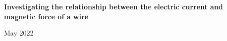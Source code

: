 \documentclass[12pt]{article}
\begin{document}
	\begin{center}
		\textbf{\large Investigating the relationship between the electric current and magnetic force of a wire}

		\vspace*{12pt}

		May 2022
	\end{center}

    

	

	

	

	

	

	\newpage

	\printbibliography[
		heading=bibintoc,
		title={Bibliography}
	]
\end{document}

